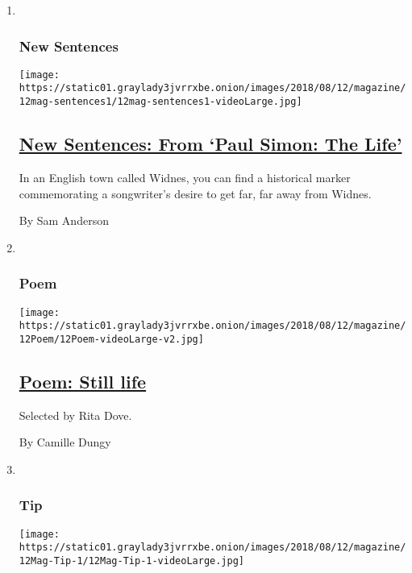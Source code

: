 \begin{enumerate}
\def\labelenumi{\arabic{enumi}.}
\item ~
  \hypertarget{new-sentences}{%
  \subsubsection{New Sentences}\label{new-sentences}}

  \texttt{[image: https://static01.graylady3jvrrxbe.onion/images/2018/08/12/magazine/12mag-sentences1/12mag-sentences1-videoLarge.jpg]}

  \hypertarget{new-sentences-from-paul-simon-the-life}{%
  \subsection{\texorpdfstring{\href{/2018/08/08/magazine/new-sentences-from-paul-simon-the-life.html}{New
  Sentences: From `Paul Simon: The
  Life'}}{New Sentences: From `Paul Simon: The Life'}}\label{new-sentences-from-paul-simon-the-life}}

  In an English town called Widnes, you can find a historical marker
  commemorating a songwriter's desire to get far, far away from Widnes.

  By Sam Anderson
\item ~
  \hypertarget{poem}{%
  \subsubsection{Poem}\label{poem}}

  \texttt{[image: https://static01.graylady3jvrrxbe.onion/images/2018/08/12/magazine/12Poem/12Poem-videoLarge-v2.jpg]}

  \hypertarget{poem-still-life}{%
  \subsection{\texorpdfstring{\href{/2018/08/09/magazine/poem-still-life.html}{Poem:
  Still life}}{Poem: Still life}}\label{poem-still-life}}

  Selected by Rita Dove.

  By Camille Dungy
\item ~
  \hypertarget{tip}{%
  \subsubsection{Tip}\label{tip}}

  \texttt{[image: https://static01.graylady3jvrrxbe.onion/images/2018/08/12/magazine/12Mag-Tip-1/12Mag-Tip-1-videoLarge.jpg]}


\end{enumerate}
